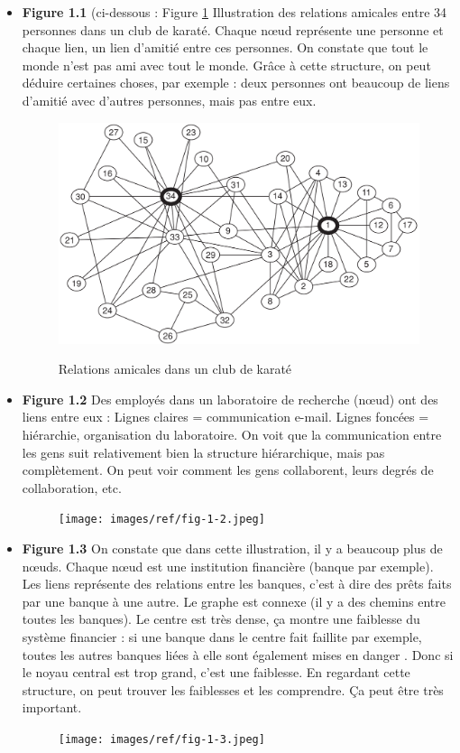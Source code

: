 \begin{itemize}

	\item \textbf{Figure 1.1} (ci-dessous : Figure \ref{karate} Illustration des relations amicales entre 34 personnes dans un club de karaté.
Chaque nœud représente une personne et chaque lien, un lien d'amitié entre ces personnes.
On constate que tout le monde n'est pas ami avec tout le monde. Grâce à cette structure, on peut déduire certaines choses, par exemple : deux personnes ont beaucoup de liens d'amitié avec d'autres personnes, mais pas entre eux.

\begin{figure}[!h]
\centering
\includegraphics[width=0.9\linewidth]{images/17_karate_club.png}
\label{karate}
\caption{Relations amicales dans un club de karaté}
\end{figure}

	\item \textbf{Figure 1.2} Des employés dans un laboratoire de recherche (nœud) ont des liens entre eux :
Lignes claires = communication e-mail.
Lignes foncées = hiérarchie, organisation du laboratoire.
On voit que la communication entre les gens suit relativement bien la structure hiérarchique, mais pas complètement. On peut voir comment les gens collaborent, leurs degrés de collaboration, etc.

\begin{figure}[!h]
\centering
\texttt{[image: images/ref/fig-1-2.jpeg]}
\end{figure}

	\item \textbf{Figure 1.3} On constate que dans cette illustration, il y a beaucoup plus de nœuds. Chaque nœud est une institution financière (banque par exemple). Les liens représente des relations entre les banques, c'est à dire des prêts faits par une banque à une autre. Le graphe est connexe (il y a des chemins entre toutes les banques). Le centre est très dense, ça montre une faiblesse du système financier : si une banque dans le centre fait faillite par exemple, toutes les autres banques liées à elle sont également mises en danger . Donc si le noyau central est trop grand, c'est une faiblesse. En regardant cette structure, on peut trouver les faiblesses et les comprendre. Ça peut être très important.
\begin{figure}[!h]
\centering
\texttt{[image: images/ref/fig-1-3.jpeg]}
\end{figure}


\end{itemize}
